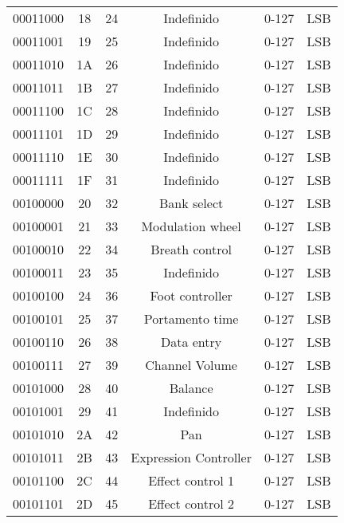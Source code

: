 \begin{center}
\begin{supertabular}{| c | c | c | c | c | c |}
             00011000 & 18 & 24  & Indefinido & 0-127 & LSB \\
                00011001 & 19 & 25  & Indefinido & 0-127 & LSB \\
             00011010 & 1A & 26  & Indefinido & 0-127 & LSB \\
                00011011 & 1B & 27  & Indefinido & 0-127 & LSB \\
             00011100 & 1C & 28  & Indefinido & 0-127 & LSB \\
                00011101 & 1D & 29  & Indefinido & 0-127 & LSB \\
             00011110 & 1E & 30  & Indefinido & 0-127 & LSB \\
                00011111 & 1F & 31  & Indefinido & 0-127 & LSB \\
             00100000 & 20 & 32  & Bank select & 0-127 & LSB \\
                00100001 & 21 & 33  & Modulation wheel & 0-127 & LSB \\
             00100010 & 22 & 34  & Breath control & 0-127 & LSB \\
                00100011 & 23 & 35  & Indefinido & 0-127 & LSB \\
             00100100 & 24 & 36  & Foot controller & 0-127 & LSB \\
                00100101 & 25 & 37  & Portamento time & 0-127 & LSB \\
             00100110 & 26 & 38  & Data entry & 0-127 & LSB \\
                00100111 & 27 & 39  & Channel Volume & 0-127 & LSB \\
             00101000 & 28 & 40  & Balance & 0-127 & LSB \\
                00101001 & 29 & 41  & Indefinido & 0-127 & LSB \\
             00101010 & 2A & 42  & Pan & 0-127 & LSB \\
                00101011 & 2B & 43  & Expression Controller & 0-127 & LSB \\
             00101100 & 2C & 44  & Effect control 1 & 0-127 & LSB \\
                00101101 & 2D & 45  & Effect control 2 & 0-127 & LSB \\

\end{supertabular}
\end{center}
